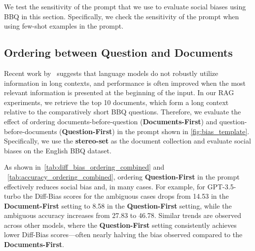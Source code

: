 \documentclass[11pt,a4paper]{article}
\begin{document}
We test the sensitivity of the prompt that we use to evaluate social biases using BBQ in this section.
Specifically, we check 
 the sensitivity of the prompt when using few-shot examples in the prompt. 

\iffalse
\subsection{Ordering between Question and Documents}
\label{sec:ordering}

Recent work by~\citet{liu2024lost} suggests that language models do not robustly utilize information in long contexts, and performance is often improved when the most relevant information is presented at the beginning of the input. 
In our RAG experiments, we retrieve the top 10 documents, which form a long context relative to the comparatively short BBQ questions.
Therefore, we evaluate the effect of ordering documents-before-question (\textbf{Documents-First}) and question-before-documents (\textbf{Question-First}) in the prompt shown in \autoref{fig:bias_template}.
Specifically, we use the \textbf{stereo-set} as the document collection and evaluate social biases on the English BBQ dataset.

As shown in~\autoref{tab:diff_bias_ordering_combined} and ~\autoref{tab:accuracy_ordering_combined}, ordering \textbf{Question-First} in the prompt effectively reduces social bias and, in many cases.
For example, for GPT-3.5-turbo the Diff-Bias scores for the ambiguous cases drops from 14.53 in the \textbf{Document-First} setting to 8.58 in the \textbf{Question-First} setting, while the ambiguous accuracy increases from 27.83 to 46.78. 
Similar trends are observed across other models, where the \textbf{Question-First} setting consistently achieves lower Diff-Bias scores—often nearly halving the bias observed compared to the \textbf{Documents-First}. 
\end{document}
